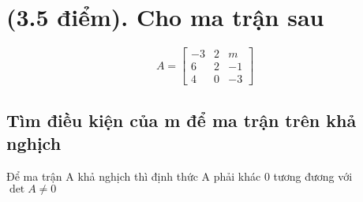 \documentclass{article}
\begin{document}
\pagestyle{fancy}
\renewcommand{\headrulewidth}{0.4pt}
\renewcommand{\footrulewidth}{0.4pt}

\large
\renewcommand{\arraystretch}{1.2}


\section[Câu 1]{{\large\normalfont(3.5 điểm). Cho ma trận sau}}
\begin{flushleft}
	\begin{equation*}
		A = \begin{bmatrix}
		-3 & 2 & m \\
		6 & 2 & -1 \\
		4 & 0 & -3
		\end{bmatrix}
	\end{equation*}
	    
	\subsection{Tìm điều kiện của m để ma trận trên khả nghịch}
	Để ma trận A khả nghịch thì định thức A phải khác 0 tương đương với \colorbox{gray!20}{$\det A \neq 0$}
	\begin{center}
		\begin{table}[h]
			\centering
			\begin{tabular}{c|c}
				    	

\end{tabular}
\end{table}
\end{center}
\end{flushleft}
\end{document}
